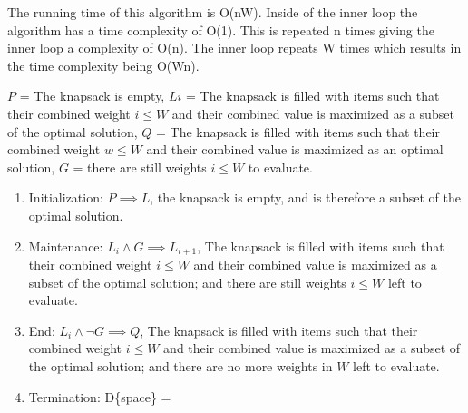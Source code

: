 \documentclass{article}
\begin{document}
\begin{enumerate}
The running time of this algorithm is O(nW). Inside of the inner loop the algorithm has a time complexity of O(1). This is repeated n times giving the inner loop a complexity of O(n). The inner loop repeats W times which results in the time complexity being O(Wn).

$P$ = The knapsack is empty, $Li$ = The knapsack is filled with items such that their combined weight $i \leq W$ and their combined value is maximized as a subset of the optimal solution, $Q$ = The knapsack is filled with items such that their combined weight $w \leq W$ and their combined value is maximized as an optimal solution, $G$ = there are still weights $i \leq W$ to evaluate.
    \begin{enumerate}
        \item Initialization: $P \implies L$, the knapsack is empty, and is therefore a subset of the optimal solution.
        \item Maintenance: $L_{i} \land G \implies L_{i+1}$, The knapsack is filled with items such that their combined weight $i \leq W$ and their combined value is maximized as a subset of the optimal solution; and there are still weights $i \leq W$ left to evaluate.
        \item End: $L_{i} \land \neg G \implies Q$, The knapsack is filled with items such that their combined weight $i \leq W$ and their combined value is maximized as a subset of the optimal solution; and there are no more weights in $W$ left to evaluate.
        \item Termination: D\{space\} =  
    \end{enumerate}
        
\end{enumerate}
\end{document}

